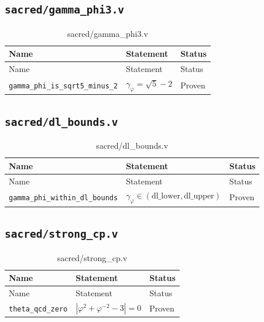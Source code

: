 \subsection{\texttt{sacred/gamma\_phi3.v}}
\label{sec:A-coq-gamma}

\begin{longtable}{lll}
\toprule
Name & Statement & Status \\
\midrule
\endfirsthead
\toprule
Name & Statement & Status \\
\midrule
\endhead
\bottomrule
\endfoot
\bottomrule
\caption{sacred/gamma\_phi3.v}
\endlastfoot
\texttt{gamma\_phi\_is\_sqrt5\_minus\_2} &
  $\gamma_{\varphi} = \sqrt{5}-2$ & Proven \\
\end{longtable}

\subsection{\texttt{sacred/dl\_bounds.v}}
\label{sec:A-coq-dl}

\begin{longtable}{lll}
\toprule
Name & Statement & Status \\
\midrule
\endfirsthead
\toprule
Name & Statement & Status \\
\midrule
\endhead
\bottomrule
\endfoot
\bottomrule
\caption{sacred/dl\_bounds.v}
\endlastfoot
\texttt{gamma\_phi\_within\_dl\_bounds} &
  $\gamma_{\varphi} \in (\text{dl\_lower},\text{dl\_upper})$ & Proven \\
\end{longtable}

\subsection{\texttt{sacred/strong\_cp.v}}
\label{sec:A-coq-strongcp}

\begin{longtable}{lll}
\toprule
Name & Statement & Status \\
\midrule
\endfirsthead
\toprule
Name & Statement & Status \\
\midrule
\endhead
\bottomrule
\endfoot
\bottomrule
\caption{sacred/strong\_cp.v}
\endlastfoot
\texttt{theta\_qcd\_zero} &
  $|\varphi^{2}+\varphi^{-2}-3|=0$ & Proven \\
\end{longtable}

